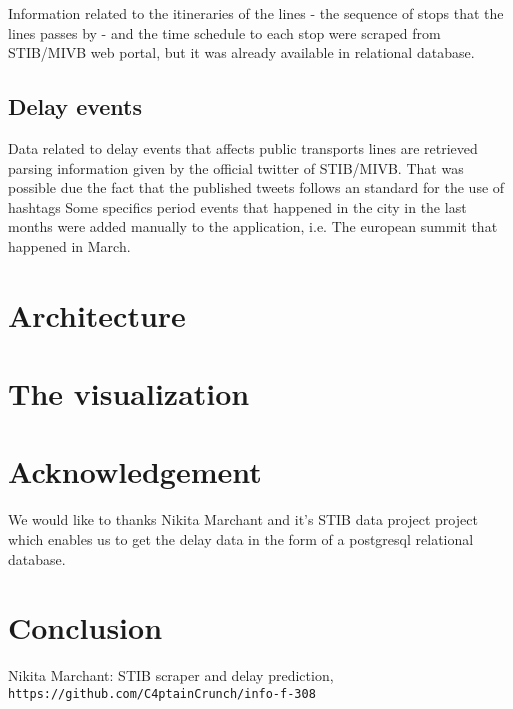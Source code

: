 \documentclass[12pt]{article}%
\begin{document}
Information related to the itineraries of the lines - the sequence of stops that the lines passes by - and the time schedule to each stop were scraped from STIB/MIVB web portal, but it was already available in relational database.

\subsection{Delay events}
Data related to delay events that affects public transports lines are retrieved parsing information given by the official twitter of STIB/MIVB. %
That was possible due the fact that the published tweets follows an standard for the use of hashtags
Some specifics period events that happened in the city in the last months were added manually to the application, i.e. The european summit that happened in March.                       
                       
\section{Architecture}
 
\section{The visualization}

\section{Acknowledgement}

We would like to thanks Nikita Marchant and it's STIB data project project which enables us to get the delay data \cite{nikita} in the form of a postgresql relational database.

\section{Conclusion}


 
\begin{thebibliography}{9}
 
Nikita Marchant: STIB scraper and delay prediction,
\\\texttt{https://github.com/C4ptainCrunch/info-f-308}
\end{thebibliography}
\end{document}
